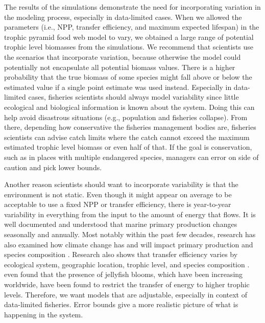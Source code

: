 \documentclass[oneside,12pt,final]{sty/ucthesis-CA2012}
\let\cite\citep                             %
\begin{document}
\begin{mainmatter}
The results of the simulations demonstrate the need for incorporating variation in the modeling process, especially in data-limited cases. When we allowed the parameters (i.e., NPP, transfer efficiency, and maximum expected lifespan) in the trophic pyramid food web model to vary, we obtained a large range of potential trophic level biomasses from the simulations. We recommend that scientists use the scenarios that incorporate variation, because otherwise the model could potentially not encapsulate all potential biomass values. There is a higher probability that the true biomass of some species might fall above or below the estimated value if a single point estimate was used instead. Especially in data-limited cases, fisheries scientists should always model variability since little ecological and biological information is known about the system. Doing this can help avoid disastrous situations (e.g., population and fisheries collapse). From there, depending how conservative the fisheries management bodies are, fisheries scientists can advise catch limits where the catch cannot exceed the maximum estimated trophic level biomass or even half of that. If the goal is conservation, such as in places with multiple endangered species, managers can error on side of caution and pick lower bounds.

\vspace{5mm} 

Another reason scientists should want to incorporate variability is that the environment is not static. Even though it might appear on average to be acceptable to use a fixed NPP or transfer efficiency, there is year-to-year variability in everything from the input to the amount of energy that flows. It is well documented and understood that marine primary production changes seasonally and annually. Most notably within the past few decades, research has also examined how climate change has and will impact primary production \cite{gregg2003ocean} and species composition \cite{walther2002ecological}. Research also shows that transfer efficiency varies by ecological system, geographic location, trophic level, and species composition \cite{baird2004energy, barnes2010global, libralato2008novel, san2006latitudinal}. \citet{condon2011jellyfish} even found that the presence of jellyfish blooms, which have been increasing worldwide, have been found to restrict the transfer of energy to higher trophic levels. Therefore, we want models that are adjustable, especially in context of data-limited fisheries. Error bounds give a more realistic picture of what is happening in the system.


\end{mainmatter}
\end{document}
